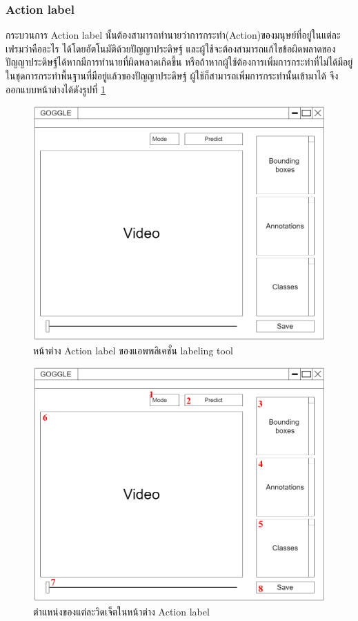 \subsubsection{Action label}
กระบวนการ Action label นั้นต้องสามารถทำนายว่าการกระทำ(Action)ของมนุษย์ที่อยู่ในแต่ละเฟรมว่าคืออะไร ได้โดยอัตโนมัติด้วยปัญญาประดิษฐ์
และผู้ใช้จะต้องสามารถแก้ไขข้อผิดพลาดของปัญญาประดิษฐ์ได้หากมีการทำนายที่ผิดพลาดเกิดขึ้น
หรือถ้าหากผู้ใช้ต้องการเพิ่มการกระทำที่ไม่ได้มีอยู่ในชุดการกระทำพื้นฐานที่มีอยู่แล้วของปัญญาประดิษฐ์ ผู้ใช้ก็สามารถเพิ่มการกระทำนั้นเข้ามาได้
จึงออกแบบหน้าต่างได้ดังรูปที่ \ref{fig:ActionLabelDraft}
\begin{figure}[!ht]
    \centering
    \includegraphics[width=1\textwidth]{chapter3/images/3_6/ActionLabelDraft.png}
    \caption{หน้าต่าง Action label ของแอพพลิเคชั่น labeling tool}
    \label{fig:ActionLabelDraft}
\end{figure}
\clearpage
\begin{figure}[!ht]
    \centering
    \includegraphics[width=1\textwidth]{chapter3/images/3_6/ActionLabelDraft_point.png}
    \caption{ตำแหน่งของแต่ละวิดเจ็ตในหน้าต่าง Action label}
    \label{fig:ActiobLabelDraft_point}
\end{figure}
